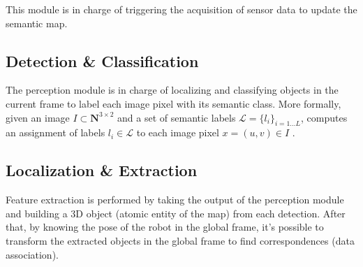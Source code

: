 \documentclass{article}
\begin{document}
	This module is in charge of triggering the acquisition of sensor data to update the semantic map.

	\subsection{Detection \& Classification}
	
	The perception module is in charge of localizing and classifying objects in the current frame to label each image pixel with its semantic class. More formally, given an image $I \subset \mathbf{N}^{3 \times 2}$ and a set of semantic labels $\mathcal{L} = \{l_i\}_{i=1 \dots L}$, computes an assignment of labels $l_i \in \mathcal{L}$ to each image pixel $x = (u,v) \in I$ .
	
	\subsection{Localization \& Extraction}
	
	Feature extraction is performed by taking the output of the perception module and building a 3D object (atomic entity of the map) from each detection. After that, by knowing the pose of the robot in the global frame, it's possible to transform the extracted objects in the global frame to find correspondences (data association).
	
\end{document}
